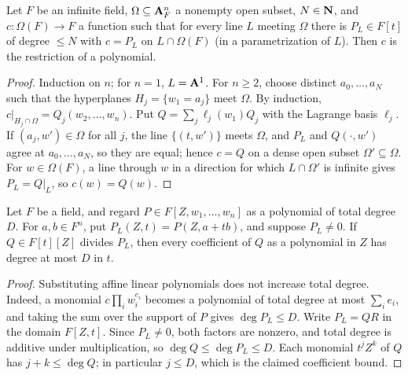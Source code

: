 \begin{lemma}\label{lem:fc-lines-poly}
\leanok
{}
Let $F$ be an infinite field, $\Omega\subseteq\mathbf{A}^n_F$ a nonempty open subset, $N\in\mathbf{N}$, and $c\colon\Omega(F)\to F$ a function such
that for every line $L$ meeting $\Omega$ there is $P_L\in F[t]$ of degree $\le N$ with $c=P_L$ on $L\cap\Omega(F)$ (in a
parametrization of $L$). Then $c$ is the restriction of a polynomial.
\end{lemma}

\begin{proof}
Induction on $n$; for $n=1$, $L=\mathbf{A}^1$. For $n\ge2$, choose distinct $a_0,\dots,a_N$ such that the hyperplanes
$H_j=\{w_1=a_j\}$ meet $\Omega$. By induction, $c|_{H_j\cap\Omega}=Q_j(w_2,\dots,w_n)$. Put $Q=\sum_j\ell_j(w_1)Q_j$ with the
Lagrange basis $\ell_j$. If $(a_j,w')\in\Omega$ for all $j$, the line $\{(t,w')\}$ meets $\Omega$, and $P_L$ and $Q(\cdot,w')$
agree at $a_0,\dots,a_N$, so they are equal; hence $c=Q$ on a dense open subset $\Omega'\subseteq\Omega$. For $w\in\Omega(F)$,
a line through $w$ in a direction for which $L\cap\Omega'$ is infinite gives $P_L=Q|_L$, so $c(w)=Q(w)$.
\end{proof}

\begin{lemma}\label{lem:fc-factor-degree}
\leanok
{}
Let $F$ be a field, and regard $P\in F[Z,w_1,\ldots,w_n]$ as a polynomial of total degree $D$.
For $a,b\in F^n$, put $P_L(Z,t)=P(Z,a+tb)$, and suppose $P_L\ne0$.
If $Q\in F[t][Z]$ divides $P_L$, then every coefficient of $Q$ as a polynomial in $Z$ has degree at most $D$ in $t$.
\end{lemma}

\begin{proof}
Substituting affine linear polynomials does not increase total degree. Indeed, a monomial
$c\prod_iw_i^{e_i}$ becomes a polynomial of total degree at most $\sum_i e_i$, and taking the sum over
the support of $P$ gives $\deg P_L\le D$. Write $P_L=QR$ in the domain $F[Z,t]$.
Since $P_L\ne0$, both factors are nonzero, and total degree is additive under multiplication, so
$\deg Q\le\deg P_L\le D$. Each monomial $t^jZ^k$ of $Q$ has $j+k\le\deg Q$;
in particular $j\le D$, which is the claimed coefficient bound.
\end{proof}

